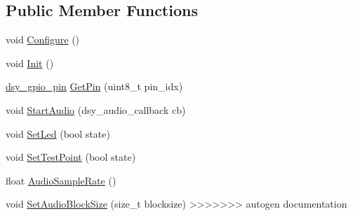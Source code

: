 \begin{DoxyCompactItemize}
\subsection*{Public Member Functions}
\begin{DoxyCompactItemize}
\item 
void \hyperlink{classdaisy_1_1_daisy_seed_a629b10d05c1df1eec01891996cbd3488}{Configure} ()
\item 
void \hyperlink{classdaisy_1_1_daisy_seed_a149a4167646d3df67a77892b92e46b65}{Init} ()
\item 
\hyperlink{structdsy__gpio__pin}{dsy\+\_\+gpio\+\_\+pin} \hyperlink{classdaisy_1_1_daisy_seed_aaa40562c6dc339155c6e34086395960d}{Get\+Pin} (uint8\+\_\+t pin\+\_\+idx)
\item 
void \hyperlink{classdaisy_1_1_daisy_seed_a86689003d9495e1bc71e47bffecea145}{Start\+Audio} (dsy\+\_\+audio\+\_\+callback cb)
\item 
void \hyperlink{classdaisy_1_1_daisy_seed_a373f3af918b533daa37c3f5205c309c2}{Set\+Led} (bool state)
\item 
void \hyperlink{classdaisy_1_1_daisy_seed_a42076d8611eded177b22f5602630dda7}{Set\+Test\+Point} (bool state)
\item 
float \hyperlink{classdaisy_1_1_daisy_seed_acffca6aa0d05bdf730b7a70604fe6347}{Audio\+Sample\+Rate} ()
\item 
void \hyperlink{classdaisy_1_1_daisy_seed_ac76ed0bcf210d9959f468cee59fdb005}{Set\+Audio\+Block\+Size} (size\+\_\+t blocksize)
>>>>>>> autogen documentation
\end{DoxyCompactItemize}

\end{DoxyCompactItemize}
